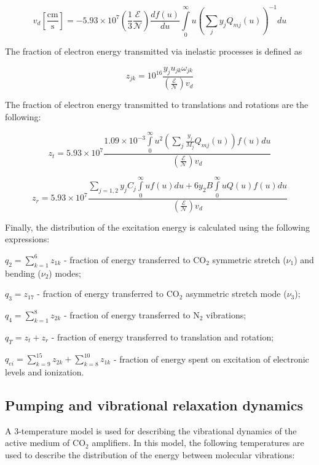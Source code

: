 \documentclass{report}
\begin{document}
\begin{equation}\label{eq:v_d}
v_d \left[ \frac{\text{cm}}{\text{s}} \right] =  - 5.93 \times 10^7 \left( \frac{1}{3}\frac{\mathcal{E}}{\mathcal{N}} \right)\frac{df(u)}{du} \int\limits_0^\infty u \left( \sum\limits_j y_j Q_{mj}(u) \right)^{-1} du
\end{equation}

The fraction of electron energy transmitted via inelastic processes is defined as

\begin{equation}\label{eq:z_jk}
z_{jk} = 10^{16} \frac{y_j u_{jk} \omega _{jk}} {\left( \frac{\mathcal{E}}{\mathcal{N}} \right) v_d}   
\end{equation}

The fraction of electron energy transmitted to translations and rotations are the following:

\begin{equation}\label{eq:z_t}
z_t = 5.93 \times 10^7 \frac{1.09 \times 10^{-3} \int\limits_0^\infty u^2 \left( \sum\limits_j \frac{y_j}{M_j} Q_{mj}(u) \right)f(u)du} {\left( \frac{\mathcal{E}}{\mathcal{N}} \right) v_d}
\end{equation}

\begin{equation}\label{eq:z_r}
z_r = 5.93 \times 10^7 \frac{\sum\limits_{j=1,2} y_j C_j \int\limits_0^\infty uf(u)du + 6 y_2 B \int\limits_0^\infty u Q(u) f(u) du} {\left( \frac{\mathcal{E}}{\mathcal{N}} \right) v_d} 
\end{equation}

Finally, the distribution of the excitation energy is calculated using the following expressions:

$q_2 = \sum\limits_{k=1}^6 z_{1k}$ - fraction of energy transferred to {CO$_2$} symmetric stretch ($\nu_1$) and bending ($\nu_2$) modes;

$q_3 = z_{17}$ - fraction of energy transferred to {CO$_2$} asymmetric stretch mode ($\nu_3$);

$q_4 = \sum\limits_{k=1}^8 z_{2k}$ - fraction of energy transferred to {N$_2$} vibrations;

$q_T = z_t + z_r$ - fraction of energy transferred to translation and rotation;

$q_{ei} = \sum\limits_{k=9}^{15} z_{2k}  + \sum\limits_{k=8}^{10} z_{1k}$ - fraction of energy spent on excitation of electronic levels and ionization.



\subsection{Pumping and vibrational relaxation dynamics}
A 3-temperature model is used for describing the vibrational dynamics of the active medium of {CO$_2$} amplifiers. In this model, the following temperatures are used to describe the distribution of the energy between molecular vibrations:
\end{document}
